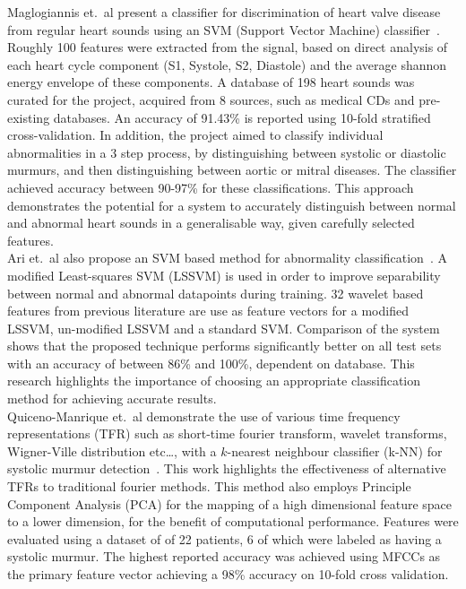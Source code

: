 \documentclass[titlepage, 12pt]{scrartcl} \usepackage{enumitem}
\begin{document}
Maglogiannis et.\ al present a classifier for discrimination of heart valve
disease from regular heart sounds using an SVM (Support Vector Machine)
classifier~\citeyearpar{Maglogiannis2009}.  Roughly 100 features were extracted
from the signal, based on direct analysis of each heart cycle component (S1,
Systole, S2, Diastole) and the average shannon energy envelope of these
components.  A database of 198 heart sounds was curated for the project,
acquired from 8 sources, such as medical CDs and pre-existing databases.  An
accuracy of 91.43\% is reported using 10-fold stratified cross-validation.  In
addition, the project aimed to classify individual abnormalities in a 3 step
process, by distinguishing between systolic or diastolic murmurs, and then
distinguishing between aortic or mitral diseases. The classifier achieved
accuracy between 90-97\% for these classifications. This approach demonstrates
the potential for a system to accurately distinguish between normal and
abnormal heart sounds in a generalisable way, given carefully selected
features.\\

Ari et.\ al also propose an SVM based method for abnormality
classification~\citeyearpar{Ari2010}. A modified Least-squares SVM (LSSVM) is
used in order to improve separability between normal and abnormal datapoints
during training. 32 wavelet based features from previous literature are use as
feature vectors for a modified LSSVM, un-modified LSSVM and a standard SVM.
Comparison of the system shows that the proposed technique performs
significantly better on all test sets with an accuracy of between 86\% and
100\%, dependent on database. This research highlights the importance of
choosing an appropriate classification method for achieving accurate results.\\

Quiceno-Manrique et.\ al demonstrate the use of various time frequency
representations (TFR) such as short-time fourier transform, wavelet transforms,
Wigner-Ville distribution etc\ldots, with a $k$-nearest neighbour classifier
(k-NN) for systolic murmur detection~\citeyearpar{Quiceno-Manrique2010a}. This
work highlights the effectiveness of alternative TFRs to traditional fourier
methods. This method also employs Principle Component Analysis (PCA) for the
mapping of a high dimensional feature space to a lower dimension, for the
benefit of computational performance. Features were evaluated using a dataset
of of 22 patients, 6 of which were labeled as having a systolic murmur. The
highest reported accuracy was achieved using MFCCs as the primary feature
vector achieving a 98\% accuracy on 10-fold cross validation.\\
\end{document}
